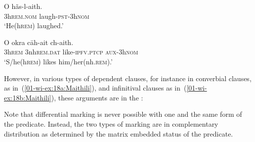 \documentclass[output=paper]{LSP/langsci}
\begin{document}
\ea\label{01-wi-ex:17:Maithili}
\begin{xlist}

\ex\label{01-wi-ex:17a:Maithili}
	\gll O		hãs-l-aith.\\
	3h\textsc{rem.nom}	laugh-\textsc{pst}-3h\textsc{nom}\\
	\glt ‘He(h\textsc{rem}) laughed.’ %
	
\ex\label{01-wi-ex:17b:Maithili}
	\gll O		okra			cāh-ait			ch-aith.\\
	3h\textsc{rem}	3nh\textsc{rem.dat}	like-\textsc{ipfv.ptcp}	\textsc{aux}-3h\textsc{nom}\\
	\glt ‘S/he(h\textsc{rem}) likes him/her(nh.\textsc{rem}).’ %
\end{xlist}
\z

\noindent However, in various types of dependent clauses, for instance in converbial clauses, as in~(\ref{01-wi-ex:18a:Maithili}), and infinitival clauses as in~(\ref{01-wi-ex:18b:Maithili}), these arguments are in the :


\noindent Note that differential marking is never possible with one and the same form of the predicate. 
Instead, the two types of marking are in complementary distribution as determined by the matrix \vs embedded status of the predicate.
\end{document}
